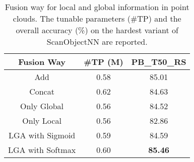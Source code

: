 \begin{table}[!t]
\scriptsize
\setlength{\tabcolsep}{7.3mm}
\centering
\caption{Fusion way for local and global information in point clouds. The tunable parameters (\#TP) and the overall accuracy (\%) on the hardest variant of ScanObjectNN\cite{uy2019revisiting} are reported.}
\vspace{-10pt}
\label{tab:fusion_way}

\begin{tabular}{ccc}
\toprule
Fusion Way & \#TP (M) & PB\_T50\_RS \\
\midrule
Add & 0.58 & 85.01 \\
Concat & 0.62 & 84.63 \\
Only Global & 0.56 & 84.52 \\
Only Local & 0.56 & 82.86 \\
LGA with Sigmoid & 0.59 & 84.59 \\
\rowcolor{linecolor!40}LGA with Softmax & 0.60 & \textbf{85.46} \\
\bottomrule
\end{tabular}
\end{table}
